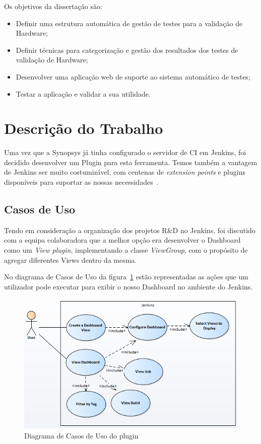 \documentclass[9pt,a4paper]{extarticle}
\begin{document}
\begin{multicols}{2}
Os objetivos da dissertação são:

\begin{itemize}
\item Definir uma estrutura automática de gestão de testes para a validação de Hardware;
\item Definir técnicas para categorização e gestão dos resultados dos testes de validação de Hardware;
\item Desenvolver uma aplicação web de suporte ao sistema automático de testes;
\item Testar a aplicação e validar a sua utilidade.
\end{itemize}

\section{Descrição do Trabalho}\label{sec:work}

Uma vez que a Synopsys já tinha configurado o servidor de CI em Jenkins, foi decidido desenvolver um Plugin para esta ferramenta. Temos também a vantagem de Jenkins ser muito costumizável, com centenas de \textit{extension points} e plugins disponíveis para suportar as nossas necessidades~\cite{kn:Jenkins}.

\subsection{Casos de Uso}\label{sc:usecases}

Tendo em consideração a organização dos projetos R\&D no Jenkins, foi discutido com a equipa colaboradora que a melhor opção era desenvolver o Dashboard como um \textit{View plugin}, implementando a classe \textit{ViewGroup}, com o propósito de agregar diferentes Views dentro da mesma.

No diagrama de Casos de Uso da figura~\ref{fig:usecases} estão representadas as ações que um utilizador pode executar para exibir o nosso Dashboard no ambiente do Jenkins.

\newcommand{\code}{\texttt}

\begin{figure}[H]
\centerline{\includegraphics[scale=.4]{figures/usecases.png}}
\caption{Diagrama de Casos de Uso do plugin}  
\label{fig:usecases}
\end{figure}


\end{multicols}
\end{document}
